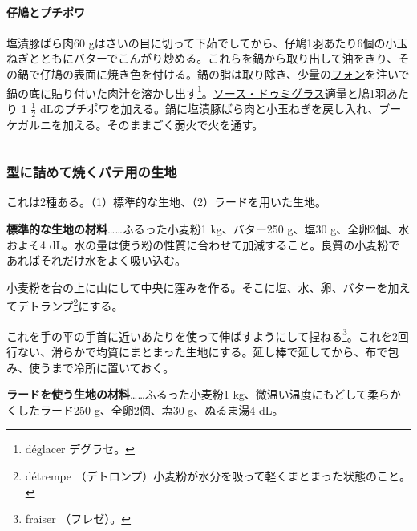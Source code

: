 \begin{Main}
\hypertarget{pigeonneaux-aux-petits-pois}{%
\paragraph{仔鳩とプチポワ}\label{pigeonneaux-aux-petits-pois}}



塩漬豚ばら肉60
gはさいの目に切って下茹でしてから、仔鳩1羽あたり6個の小玉ねぎとともにバターでこんがり炒める。これらを鍋から取り出して油をきり、その鍋で仔鳩の表面に焼き色を付ける。鍋の脂は取り除き、少量の\protect\hyperlink{fonds-brun}{フォン}を注いで鍋の底に貼り付いた肉汁を溶かし出す\footnote{déglacer
  デグラセ。}。\protect\hyperlink{sauce-demi-glace}{ソース・ドゥミグラス}適量と鳩1羽あたり
1 \(\frac{1}{2}\)
dLのプチポワを加える。鍋に塩漬豚ばら肉と小玉ねぎを戻し入れ、ブーケガルニを加える。そのままごく弱火で火を通す。

\begin{center}\rule{0.5\linewidth}{\linethickness}\end{center}

\hypertarget{pates-pour-pates-moules}{%
\subsubsection{型に詰めて焼くパテ用の生地}\label{pates-pour-pates-moules}}

これは2種ある。（1）標準的な生地、（2）ラードを用いた生地。

\textbf{標準的な生地の材料}\ldots{}\ldots{}ふるった小麦粉1 kg、バター250
g、塩30 g、全卵2個、水およそ4
dL。水の量は使う粉の性質に合わせて加減すること。良質の小麦粉であればそれだけ水をよく吸い込む。

小麦粉を台の上に山にして中央に窪みを作る。そこに塩、水、卵、バターを加えてデトランプ\footnote{détrempe
  （デトロンプ）小麦粉が水分を吸って軽くまとまった状態のこと。}にする。

これを手の平の手首に近いあたりを使って伸ばすようにして捏ねる\footnote{fraiser
  （フレゼ）。}。これを2回行ない、滑らかで均質にまとまった生地にする。延し棒で延してから、布で包み、使うまで冷所に置いておく。

\textbf{ラードを使う生地の材料}\ldots{}\ldots{}ふるった小麦粉1
kg、微温い温度にもどして柔らかくしたラード250 g、全卵2個、塩30
g、ぬるま湯4 dL。


\end{Main}
